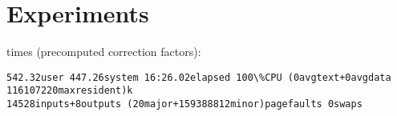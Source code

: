 \chapter{Experiments}\label{chap:experiments}

% 
% 


times (precomputed correction factors):
\begin{verbatim}
542.32user 447.26system 16:26.02elapsed 100\%CPU (0avgtext+0avgdata 116107220maxresident)k
14528inputs+8outputs (20major+159388812minor)pagefaults 0swaps
\end{verbatim}




